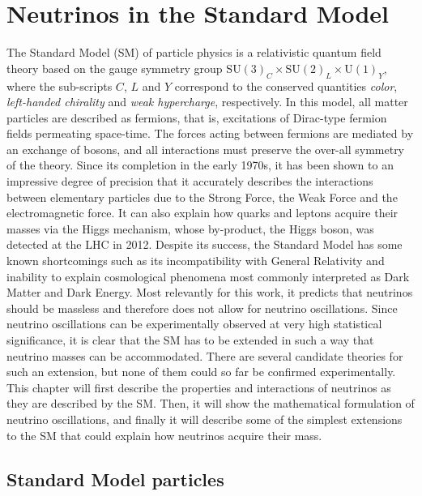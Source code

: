 \setchapterpreamble[u]{\margintoc}

\chapter{Neutrinos in the Standard Model}


The Standard Model (SM) of particle physics is a relativistic quantum field theory based on the gauge symmetry group $\mathrm{SU}(3)_C \times \mathrm{SU}(2)_L \times \mathrm{U}(1)_Y$, where the sub-scripts $C$, $L$ and $Y$ correspond to the conserved quantities \emph{color}, \emph{left-handed chirality} and \emph{weak hypercharge}, respectively. In this model, all matter particles are described as fermions, that is, excitations of Dirac-type fermion fields permeating space-time. The forces acting between fermions are mediated by an exchange of bosons, and all interactions must preserve the over-all symmetry of the theory. Since its completion in the early 1970s, it has been shown to an impressive degree of precision that it accurately describes the interactions between elementary particles due to the Strong Force, the Weak Force and the electromagnetic force. It can also explain how quarks and leptons acquire their masses via the Higgs mechanism, whose by-product, the Higgs boson, was detected at the LHC in 2012\cite{Aad_2012}. Despite its success, the Standard Model has some known shortcomings such as its incompatibility with General Relativity and inability to explain cosmological phenomena most commonly interpreted as Dark Matter and Dark Energy.  Most relevantly for this work, it predicts that neutrinos should be massless and therefore does not allow for neutrino oscillations. Since neutrino oscillations can be experimentally observed at very high statistical significance\cite{PhysRevLett.81.1562}, it is clear that the SM has to be extended in such a way that neutrino masses can be accommodated. There are several candidate theories for such an extension, but none of them could so far be confirmed experimentally. This chapter will first describe the properties and interactions of neutrinos as they are described by the SM. Then, it will show the mathematical formulation of neutrino oscillations, and finally it will describe some of the simplest extensions to the SM that could explain how neutrinos acquire their mass.

\section{Standard Model particles}

